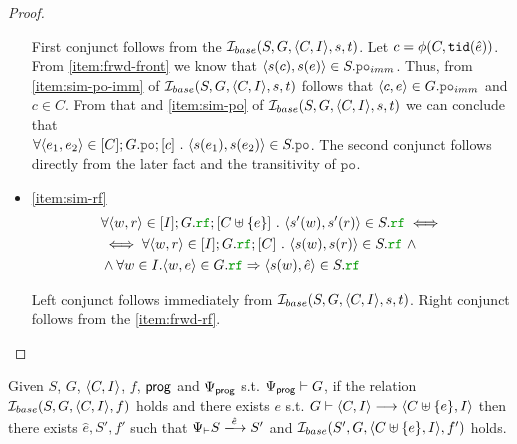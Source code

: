 \documentclass[12pt]{article}
\begin{document}
\begin{proof}
\begin{itemize}
    First conjunct follows from the $\mathcal{I}_{base}(S, G, \langle C, I \rangle, s, t)$.
    Let $c = \phi(C, {\mathtt{tid}}(\hat{e}))$. 
    From \ref{item:frwd-front} we know that $\tup{s(c), s(e)} \in S.\lPO_{imm}$.
    Thus, from \ref{item:sim-po-imm} of $\mathcal{I}_{base}(S, G, \langle C, I \rangle, s, t)$
    follows that $\tup{c, e} \in G.\lPO_{imm}$ and $c \in C$.
    From that and \ref{item:sim-po} of $\mathcal{I}_{base}(S, G, \langle C, I \rangle, s, t)$
    we can conclude that \\
    $\forall{\tup{e_1, e_2} \in [C];G.\lPO;[c]} ~.~ \tup{s(e_1), s(e_2)} \in S.\lPO$.
    The second conjunct follows directly from the later fact and the transitivity of $\lPO$.

  \item \ref{item:sim-rf} \\
    
    \begin{equation*}
      \begin{split}
        & \forall{\tup{w, r} \in [I];G.\lRF;[C \uplus \{e\}]} ~.~
          \tup{s'(w), s'(r)} \in S.\lRF \iff \\
        & \iff \forall{\tup{w, r} \in [I];G.\lRF;[C]} ~.~ \tup{s(w), s(r)} \in S.\lRF ~ \wedge \\
        & \wedge \forall{w \in I}. \tup{w, e} \in G.\lRF \Rightarrow \tup{s(w), \hat{e}} \in S.\lRF
      \end{split}
    \end{equation*}

    Left conjunct follows immediately from $\mathcal{I}_{base}(S, G, \langle C, I \rangle, s, t)$.
    Right conjunct follows from the \ref{item:frwd-rf}.
    
  \end{itemize}
  
\end{proof}

\begin{lemma}
  Given $S$, $G$, $\langle C, I \rangle$, $f$, $\mathsf{prog}$ and $\Psi_{\mathsf{prog}}$
  s.t. $\Psi_{\mathsf{prog}} \vdash G$,
  if the relation $\mathcal{I}_{base}(S, G, \langle C, I \rangle, f)$ holds and
  there exists $e$ s.t. $G \vdash \langle C, I \rangle \longrightarrow \langle C \uplus \{e\}, I \rangle$ then
  there exists $\hat{e}, S', f'$ such that
  $\Execs \vdash S \esstep{\hat{e}} S'$
  and $\mathcal{I}_{base}(S', G, \langle C \uplus \{e\}, I \rangle, f')$ holds.
\end{lemma}
\end{document}
